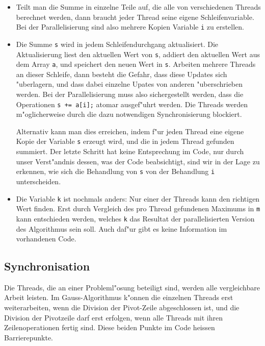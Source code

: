 \begin{itemize}
\item
Teilt man die Summe in einzelne Teile auf, die alle von verschiedenen
Threads berechnet werden, dann braucht jeder Thread seine eigene 
Schleifenvariable.
Bei der Parallelisierung sind also mehrere Kopien Variable {\tt i} zu
erstellen.
\item
Die Summe {\tt s} wird in jedem Schleifendurchgang aktualisiert.
Die Aktualisierung liest den aktuellen Wert von {\tt s}, addiert
den aktuellen Wert aus dem Array {\tt a}, und speichert den neuen Wert
in {\tt s}.
Arbeiten mehrere Threads an dieser Schleife, dann besteht die Gefahr,
dass diese Updates sich "uberlagern, und dass dabei einzelne Upates
von anderen "uberschrieben werden.
Bei der Parallelisierung muss also sichergestellt werden, dass die
Operationen \verb/s += a[i];/ atomar ausgef"uhrt werden.
Die Threads werden m"oglicherweise durch die dazu notwendigen Synchronisierung
blockiert.

Alternativ kann man dies erreichen, indem f"ur jeden Thread eine eigene
Kopie der Variable {\tt s} erzeugt wird, und die in jedem Thread
gefunden summiert.
Der letzte Schritt hat keine Entsprechung im Code, nur durch unser
Verst"andnis dessen, was der Code beabsichtigt, sind wir in der Lage
zu erkennen, wie sich die Behandlung von {\tt s} von der Behandlung
{\tt i} unterscheiden.
\item
Die Variable {\tt k} ist nochmals anders:  Nur einer der Threads kann den
richtigen Wert finden.
Erst durch Vergleich des pro Thread gefundenen Maximums in {\tt m}
kann entschieden werden, welches {\tt k} das Resultat der
parallelisierten Version des Algorithmus sein soll.
Auch daf"ur gibt es keine Information im vorhandenen Code.
\end{itemize}

\subsection{Synchronisation}
Die Threads, die an einer Probleml"osung beteiligt sind, werden alle
vergleichbare Arbeit leisten. 
Im Gauss-Algorithmus k"onnen die einzelnen Threads erst weiterarbeiten,
wenn die Division der Pivot-Zeile abgeschlossen ist, und die Division
der Pivotzeile darf erst erfolgen,
wenn alle Threads mit ihren Zeilenoperationen fertig sind.
Diese beiden Punkte im Code heissen Barrierepunkte.

